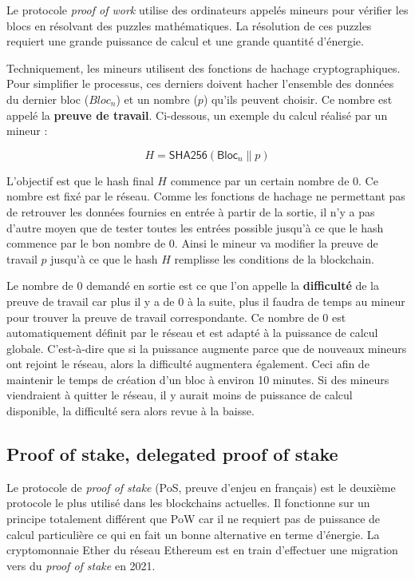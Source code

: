 Le protocole \textit{proof of work} utilise des ordinateurs appelés mineurs pour vérifier les blocs en résolvant des puzzles mathématiques. La résolution de ces puzzles requiert une grande puissance de calcul et une grande quantité d'énergie.

Techniquement, les mineurs utilisent des fonctions de hachage cryptographiques. Pour simplifier le processus, ces derniers doivent hacher l'ensemble des données du dernier bloc ($Bloc_n$) et un nombre ($p$) qu'ils peuvent choisir. Ce nombre est appelé la \textbf{preuve de travail}. Ci-dessous, un exemple du calcul réalisé par un mineur :

\begin{equation*}
    H = \textsf{SHA256}(\textsf{Bloc}_n \| p)
\end{equation*}

L'objectif est que le hash final $H$ commence par un certain nombre de 0. Ce nombre est fixé par le réseau. Comme les fonctions de hachage ne permettant pas de retrouver les données fournies en entrée à partir de la sortie, il n'y a pas d'autre moyen que de tester toutes les entrées possible jusqu'à ce que le hash commence par le bon nombre de 0. Ainsi le mineur va modifier la preuve de travail $p$ jusqu'à ce que le hash $H$ remplisse les conditions de la blockchain. 

Le nombre de 0 demandé en sortie est ce que l'on appelle la \textbf{difficulté} de la preuve de travail car plus il y a de 0 à la suite, plus il faudra de temps au mineur pour trouver la preuve de travail correspondante. Ce nombre de 0 est automatiquement définit par le réseau et est adapté à la puissance de calcul globale. C'est-à-dire que si la puissance augmente parce que de nouveaux mineurs ont rejoint le réseau, alors la difficulté augmentera également. Ceci afin de maintenir le temps de création d'un bloc à environ 10 minutes. Si des mineurs viendraient à quitter le réseau, il y aurait moins de puissance de calcul disponible, la difficulté sera alors revue à la baisse.

\subsection{Proof of stake, delegated proof of stake}
\label{consensus:pos}

Le protocole de \textit{proof of stake} (PoS, preuve d'enjeu en français) est le deuxième protocole le plus utilisé dans les blockchains actuelles. Il fonctionne sur un principe totalement différent que PoW car il ne requiert pas de puissance de calcul particulière ce qui en fait un bonne alternative en terme d'énergie. La cryptomonnaie Ether du réseau Ethereum est en train d'effectuer une migration vers du \textit{proof of stake} en 2021.

